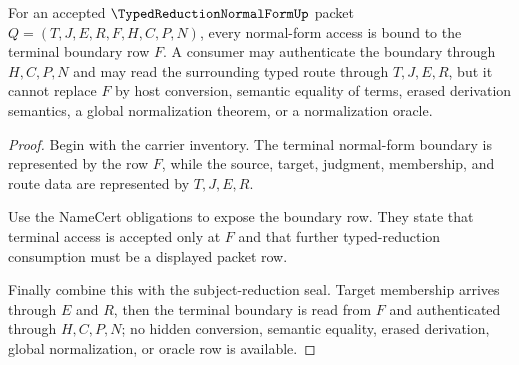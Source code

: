 \begin{theorem}
\label{thm:typed-reduction-normal-form-terminal-boundary-nonescape}
For an accepted $\TypedReductionNormalFormUp$ packet $Q=(T,J,E,R,F,H,C,P,N)$, every normal-form access is bound to the terminal boundary row $F$. A consumer may authenticate the boundary through $H,C,P,N$ and may read the surrounding typed route through $T,J,E,R$, but it cannot replace $F$ by host conversion, semantic equality of terms, erased derivation semantics, a global normalization theorem, or a normalization oracle.
\end{theorem}
\begin{proof}
Begin with the carrier inventory. The terminal normal-form boundary is represented by the row $F$, while the source, target, judgment, membership, and route data are represented by $T,J,E,R$.

Use the NameCert obligations to expose the boundary row. They state that terminal access is accepted only at $F$ and that further typed-reduction consumption must be a displayed packet row.

Finally combine this with the subject-reduction seal. Target membership arrives through $E$ and $R$, then the terminal boundary is read from $F$ and authenticated through $H,C,P,N$; no hidden conversion, semantic equality, erased derivation, global normalization, or oracle row is available.
\end{proof}

